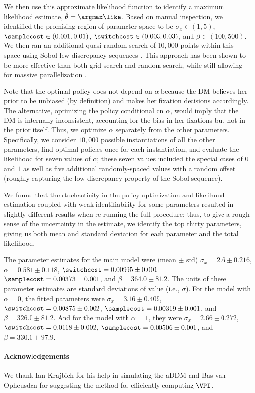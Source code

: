 We then use this approximate likelihood function to identify a maximum likelihood estimate, $\hat{\theta}=\argmax \like$. Based on manual inspection, we identified the promising region of parameter space to be $\sigma_{x}\in(1,5)$, $\samplecost\in(0.001,0.01)$, $\switchcost\in(0.003,0.03)$, and $\beta\in(100,500)$.
We then ran an additional quasi-random search of $10{,}000$ points within this space using Sobol low-discrepancy sequences \citep{sobol1967distribution}. This approach has been shown to be more effective than both grid search and random search, while still allowing for massive parallelization \citep{bergstra2012random}. 

Note that the optimal policy does not depend on $\alpha$ because the DM believes her prior to be unbiased (by definition) and makes her fixation decisions accordingly.
The alternative, optimizing the policy conditional on $\alpha$, would imply that the DM is internally inconsistent, accounting for the bias in her fixations but not in the prior itself.
Thus, we optimize $\alpha$ separately from the other parameters.
Specifically, we consider $10{,}000$ possible instantiations of all the other parameters, find optimal policies once for each instantiation, and evaluate the likelihood for seven values of $\alpha$; these seven values included the special cases of $0$ and $1$ as well as five additional randomly-spaced values with a random offset (roughly capturing the low-discrepancy property of the Sobol sequence).

We found that the stochasticity in the policy optimization and likelihood estimation coupled with weak identifiability for some parameters resulted in slightly different results when re-running the full procedure; thus, to give a rough sense of the uncertainty in the estimate, we identify the top thirty parameters, giving us both mean and standard deviation for each parameter and the total likelihood.

The parameter estimates for the main model were (mean $\pm$ std)
$\sigma_x = 2.6 \pm 0.216$,
$\alpha = 0.581 \pm 0.118$,
$\switchcost =  0.00995 \pm 0.001$,
$\samplecost = 0.00373 \pm 0.001$, and
$\beta = 364.0 \pm 81.2$.
The units of these parameter estimates are standard deviations of value (i.e., $\bar{\sigma}$). 
%
For the model with $\alpha = 0$, the fitted parameters were
$\sigma_x = 3.16 \pm 0.409$,
$\switchcost =  0.00875 \pm 0.002$,
$\samplecost = 0.00319 \pm 0.001$, and
$\beta = 326.0 \pm 81.2$.
%
And for the model with $\alpha = 1$, they were
$\sigma_x = 2.66 \pm 0.272$,
$\switchcost =   0.0118 \pm 0.002$,
$\samplecost = 0.00506 \pm 0.001$, and
$\beta = 330.0 \pm 97.9$.


\paragraph{Acknowledgements}
We thank Ian Krajbich for his help in simulating the aDDM and Bas van Opheusden for suggesting the method for efficiently computing $\VPI$.

